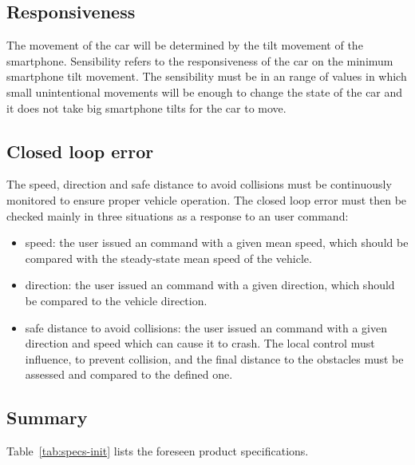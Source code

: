 \subsection{Responsiveness}%
\label{sec:org622e63a}
The movement of the car will be determined by the tilt movement of the smartphone. Sensibility refers to the responsiveness of the car on the minimum smartphone tilt movement. The sensibility must be in an range of values in which small unintentional movements will be enough to change the state of the car and it does not take big smartphone tilts for the car to move.
\subsection{Closed loop error}%
\label{sec:closed-loop-error-specs}
The speed, direction and safe distance to avoid collisions must be continuously monitored to ensure proper vehicle operation. The closed loop error must then be checked mainly in three situations as a response to an user command:
\begin{itemize}
\item speed: the user issued an command with a given mean speed, which should be compared with the steady-state mean speed of the vehicle.
\item direction: the user issued an command with a given direction, which should be compared to the vehicle direction.
\item safe distance to avoid collisions: the user issued an command with a given direction and speed which can cause it to crash. The local control must influence, to prevent collision, and the final distance to the obstacles must be assessed and compared to the defined one.
\end{itemize}
\subsection{Summary}%
\label{sec:org1f95256}
Table~\ref{tab:specs-init} lists the foreseen product specifications.

